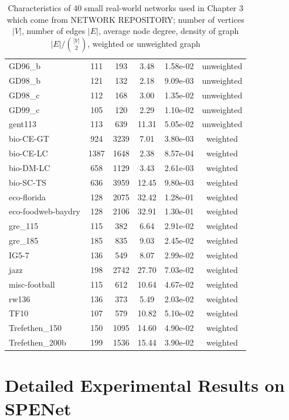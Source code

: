 \documentclass[senior,final,11pt]{iscs-thesis}
\begin{document}
\begin{table}[htb]
\begin{center}
{\begin{tabular}{l | c c c c c}
        GD96\_b & 111 & 193 & 3.48 & 1.58e-02 & unweighted\\
        GD98\_b & 121 & 132 & 2.18 & 9.09e-03 & unweighted\\
        GD98\_c & 112 & 168 & 3.00 & 1.35e-02 & unweighted\\
        GD99\_c & 105 & 120 & 2.29 & 1.10e-02 & unweighted\\
        gent113 & 113 & 639 & 11.31 & 5.05e-02 & unweighted\\
        bio-CE-GT & 924 & 3239 & 7.01 & 3.80e-03 & weighted\\
        bio-CE-LC & 1387 & 1648 & 2.38 & 8.57e-04 & weighted\\
        bio-DM-LC & 658 & 1129 & 3.43 & 2.61e-03 & weighted\\
        bio-SC-TS & 636 & 3959 & 12.45 & 9.80e-03 & weighted\\
        eco-florida & 128 & 2075 & 32.42 & 1.28e-01 & weighted\\
        eco-foodweb-baydry & 128 & 2106 & 32.91 & 1.30e-01 & weighted\\
        gre\_115 & 115 & 382 & 6.64 & 2.91e-02 & weighted\\
        gre\_185 & 185 & 835 & 9.03 & 2.45e-02 & weighted\\
        IG5-7 & 136 & 549 & 8.07 & 2.99e-02 & weighted\\
        jazz & 198 & 2742 & 27.70 & 7.03e-02 & weighted\\
        misc-football & 115 & 612 & 10.64 & 4.67e-02 & weighted\\
        rw136 & 136 & 373 & 5.49 & 2.03e-02 & weighted\\
        TF10 & 107 & 579 & 10.82 & 5.10e-02 & weighted\\
        Trefethen\_150 & 150 & 1095 & 14.60 & 4.90e-02 & weighted\\
        Trefethen\_200b & 199 & 1536 & 15.44 & 3.90e-02 & weighted\\
      \end{tabular}
      }
      \caption{Characteristics of 40 small real-world networks used in Chapter 3 which come from NETWORK REPOSITORY; number of vertices $|V|$, number of edges $|E|$, average node degree, density of graph $|E|/ \binom{|V|}{2}$, weighted or unweighted graph}
      \label{tab:data_spe}
    \end{center}
  \end{table}

\chapter{Detailed Experimental Results on SPENet}
\end{document}
